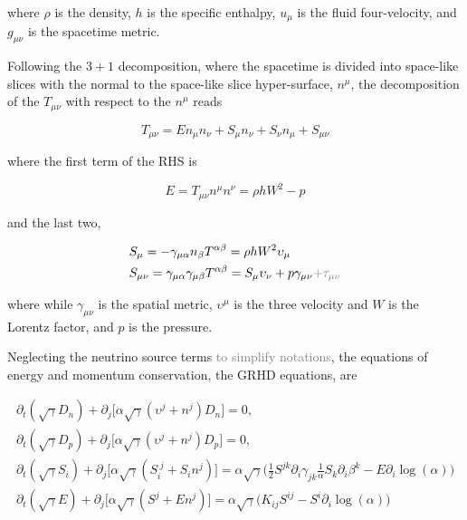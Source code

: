 \documentclass[11pt,a4paper,headinclude=true,DIV=14,BCOR=8mm,chapterprefix,listof=totoc,twoside,openright,abstracton]{scrbook}
\newcommand{\gray}[1]{\textcolor{gray}{#1}}
\begin{document}
where $\rho$ is the density, $h$ is the specific enthalpy, $u_{\mu}$ is the fluid four-velocity, and 
$g_{\mu\nu}$ is the spacetime metric.

Following the $3+1$ decomposition, 
where the spacetime is divided into space-like slices with 
the normal to the space-like slice hyper-surface, $n^{\mu}$,
the decomposition of the $T_{\mu\nu}$ with respect to the $n^{\mu}$ reads

\begin{equation}
T_{\mu\nu} = En_{\mu}n_{\nu} + S_{\mu}n_{\nu} + S_{\nu}n_{\mu} + S_{\mu\nu}
\end{equation}

where the first term of the RHS is

\begin{equation}
E = T_{\mu\nu}n^{\mu}n^{\nu} = \rho h W^2 - p
\end{equation}

and the last two,

\begin{eqnarray}
& S_{\mu} = -\gamma_{\mu\alpha}n_{\beta}T^{\alpha\beta} = \rho h W^2 \upsilon_{\mu} \\
& S_{\mu\nu} = \gamma_{\mu\alpha}\gamma_{\mu\beta}T^{\alpha\beta} = S_{\mu}\upsilon_{\nu} + p \gamma_{\mu\nu} \gray{ + \tau_{\mu\nu}}
\end{eqnarray}

where while $\gamma_{\mu\nu}$ is the spatial metric, $\upsilon^{\mu}$ is the three velocity and $W$ is the Lorentz factor, and $p$ is the pressure. 

Neglecting the neutrino source terms \gray{to simplify notations}, the equations of energy and momentum conservation, the GRHD equations, are 

\begin{eqnarray}
\label{eq:method:whisky:emomcons_lk}
\partial_t(\sqrt{\gamma}D_n) + \partial_j\Big[ \alpha\sqrt{\gamma}(\upsilon^j + n^j)D_n \Big] = 0, \\
\partial_t(\sqrt{\gamma}D_p) + \partial_j\Big[ \alpha\sqrt{\gamma}(\upsilon^j + n^j)D_p \Big] = 0, \\
\partial_t(\sqrt{\gamma}S_i) + \partial_j\Big[ \alpha \sqrt{\gamma} (S_i^{\; j} + S_i n^j) \Big] = 
\alpha \sqrt{\gamma}\Big( \frac{1}{2} S^{jk} \partial_i \gamma_{jk} \frac{1}{\alpha} S_k \partial_i \beta^k - E\partial_i \log(\alpha) \Big) \\
\partial_t(\sqrt{\gamma}E) + \partial_j\Big[ \alpha \sqrt{\gamma} (S^{j} + E n^j) \Big] = 
\alpha \sqrt{\gamma}\Big( K_{ij}S^{ij} - S^i\partial_i \log(\alpha) \Big) 
\end{eqnarray}
\end{document}
